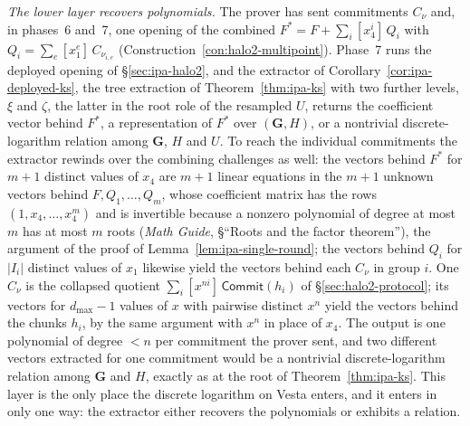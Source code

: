 \documentclass[11pt,a4paper]{article}
\theoremstyle{definition}
\newcommand{\Comm}{\mathsf{Commit}}
\begin{document}
\emph{The lower layer recovers polynomials.} The prover has sent
commitments $C_\nu$ and, in phases~6 and~7, one opening of the combined
$F^{*} = F + \sum_i [x_4^{i}]\,Q_i$ with $Q_i = \sum_e [x_1^{e}]\,
C_{\nu_{i,e}}$ (Construction~\ref{con:halo2-multipoint}). Phase~7 runs
the deployed opening of \S\ref{sec:ipa-halo2}, and the extractor of
Corollary~\ref{cor:ipa-deployed-ks}, the tree extraction of
Theorem~\ref{thm:ipa-ks} with two further levels, $\xi$ and $\zeta$, the
latter in the root role of the resampled $U$, returns
the coefficient vector behind $F^{*}$, a representation of $F^{*}$ over
$(\mathbf G, H)$, or a nontrivial discrete-logarithm relation among
$\mathbf G$, $H$ and $U$. To reach the individual commitments the
extractor rewinds over the combining challenges as well: the vectors
behind $F^{*}$ for $m + 1$ distinct values of $x_4$ are $m + 1$ linear
equations in the $m + 1$ unknown vectors behind $F, Q_1, \dots, Q_m$,
whose coefficient matrix has the rows $(1, x_4, \dots, x_4^{m})$ and is
invertible because a nonzero polynomial of degree at most $m$ has at
most $m$ roots (\emph{Math Guide}, \S``Roots and the factor theorem''),
the argument of the proof of Lemma~\ref{lem:ipa-single-round}; the
vectors behind $Q_i$ for $|I_i|$ distinct values of $x_1$ likewise yield
the vectors behind each $C_\nu$ in group $i$. One $C_\nu$ is the
collapsed quotient $\sum_i [x^{ni}]\,\Comm(h_i)$ of
\S\ref{sec:halo2-protocol}; its vectors for $d_{\max} - 1$ values of $x$
with pairwise distinct $x^{n}$ yield the vectors behind the chunks
$h_i$, by the same argument with $x^{n}$ in place of $x_4$. The output
is one polynomial of degree $< n$ per commitment the prover sent, and
two different vectors extracted for one commitment would be a nontrivial
discrete-logarithm relation among $\mathbf G$ and $H$, exactly as at the
root of Theorem~\ref{thm:ipa-ks}.
This layer is the only place the discrete logarithm on Vesta enters, and
it enters in only one way: the extractor either recovers the polynomials
or exhibits a relation.
\end{document}
